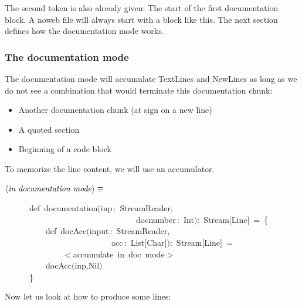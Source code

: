 \documentclass[a4paper,12pt]{article}
\begin{document}
The second token is also already given: The start of the first documentation
block. A noweb file will always start with a block like this. The next section
defines how the documentation mode works.

\subsubsection{The documentation mode}
The documentation mode will accumulate TextLines and NewLines as long as we
do not see a combination that would terminate this documentation chunk:

\begin{itemize}
\item Another documentation chunk (at sign on a new line)
\item A quoted section
\item Beginning of a code block
\end{itemize}

To memorize the line content, we will use an accumulator.

$\left<\mbox{\emph{in documentation mode}}\right>\equiv$
\begin{program}~~~~~~{\vem def}~documentation$($inp\,{\rm :}~StreamReader,
\\~~~~~~~~~~~~~~~~~~~~~~~~~~~~~~~~docnumber\,{\rm :}~Int$)${\rm :}~Stream$[$Line$]$~=~{\small\{}
\\~~~~~~~~~~{\vem def}~docAcc$($input\,{\rm :}~StreamReader,
\\~~~~~~~~~~~~~~~~~~~~~~~~~~acc\,{\rm :}~List$[$Char$]$$)${\rm :}~Stream$[$Line$]$~=
\\~~~~~~~~~~~~~~$<$accumulate~in~doc~mode$>$
\\[0.5em]~~~~~~~~~~docAcc$($inp,Nil$)$
\\~~~~~~{\small\}}
\\[0.5em]\end{program}



Now let us look at how to produce some lines:
\end{document}
